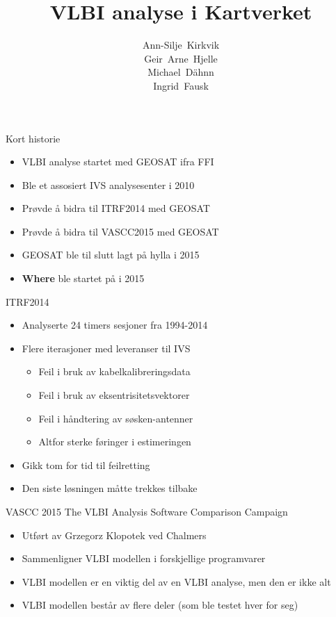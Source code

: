 \documentclass[14pt,c]{beamer}
\title{VLBI analyse i Kartverket}
\author{Ann-Silje~Kirkvik \\ Geir~Arne~Hjelle \\ Michael~D\"ahnn \\ Ingrid~Fausk}
\begin{document}
{
    \frame[plain,t]{\titlepage}
}

\begin{frame}{Kort historie}
  \begin{itemize}
    \item VLBI analyse startet med GEOSAT ifra FFI
    \item Ble et assosiert IVS analysesenter i 2010
    \item Prøvde å bidra til ITRF2014 med GEOSAT
    \item Prøvde å bidra til VASCC2015 med GEOSAT
    \item GEOSAT ble til slutt lagt på hylla i 2015
    \item \textbf{Where} ble startet på i 2015
  \end{itemize}
\end{frame}


\begin{frame}{ITRF2014}
\begin{itemize}
  \item Analyserte 24 timers sesjoner fra 1994-2014
  \item Flere iterasjoner med leveranser til IVS
  \begin{itemize}
    \item Feil i bruk av kabelkalibreringsdata
    \item Feil i bruk av eksentrisitetsvektorer
	\item Feil i håndtering av søsken-antenner
	\item Altfor sterke føringer i estimeringen 
	\end{itemize}
  \item Gikk tom for tid til feilretting
  \item Den siste løsningen måtte trekkes tilbake
\end{itemize}
\end{frame}


\begin{frame}{VASCC 2015}
 The VLBI Analysis Software Comparison Campaign
\begin{small}
  \begin{itemize}
    \item Utført av Grzegorz Klopotek ved Chalmers
    \item Sammenligner VLBI modellen i forskjellige programvarer
    \item VLBI modellen er en viktig del av en VLBI analyse, men den er ikke alt
    \item VLBI modellen består av flere deler (som ble testet hver for seg)
  \end{itemize}
\end{small}
\end{frame}
\end{document}
